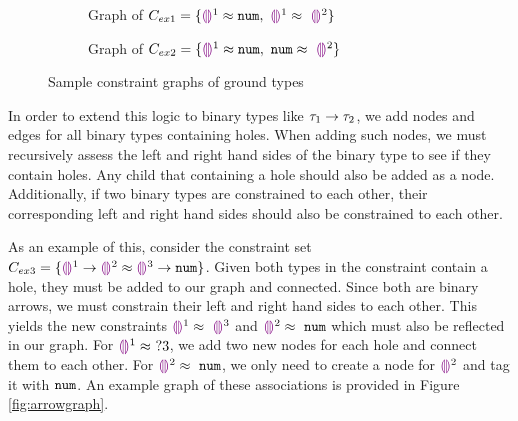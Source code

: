 \begin{figure}[htbp]
\centering
\begin{subfigure}{.49\textwidth}
  \centering
  \caption{Graph of $C_{ex1} = \{ \tehole^{1} \approx \tnum, ~ \tehole^{1} \approx~ \tehole^{2}\}$}
  \label{fig:sub1}
\end{subfigure}
\begin{subfigure}{.49\textwidth}
  \centering
  \caption{Graph of $C_{ex2} = \{ \tehole^{1} \approx \tnum, ~ \tnum \approx~ \tehole^{2}\}$}
  \label{fig:sub2}
\end{subfigure}
\caption{Sample constraint graphs of ground types}
\label{fig:ex1ex2graphs}
\end{figure}

In order to extend this logic to binary types like $\tarr{\tau_1}{\tau_2}$, we add nodes and edges for all binary types containing holes. When adding such nodes, we must recursively assess the left and right hand sides of the binary type to see if they contain holes. Any child that containing a hole should also be added as a node. Additionally, if two binary types are constrained to each other, their corresponding left and right hand sides should also be constrained to each other.

As an example of this, consider the constraint set $C_{ex3} = \{ \tarr{\tehole^{1}}{\tehole^{2}} \approx \tarr{\tehole^{3}}{\tnum}  \}$.
Given both types in the constraint contain a hole, they must be added to our graph and connected. Since both are binary arrows, we must constrain their left and right hand sides to each other. This yields the new constraints $\tehole^{1} \approx~ \tehole^{3}$ and $\tehole^{2} \approx~ \tnum$ which must also be reflected in our graph. For $\tehole^{1} \approx~ ?3$, we add two new nodes for each hole and connect them to each other. For $\tehole^{2} \approx~ \tnum$, we only need to create a node for $\tehole^{2}$ and tag it with $\tnum$. An example graph of these associations is provided in Figure \ref{fig:arrowgraph}.

